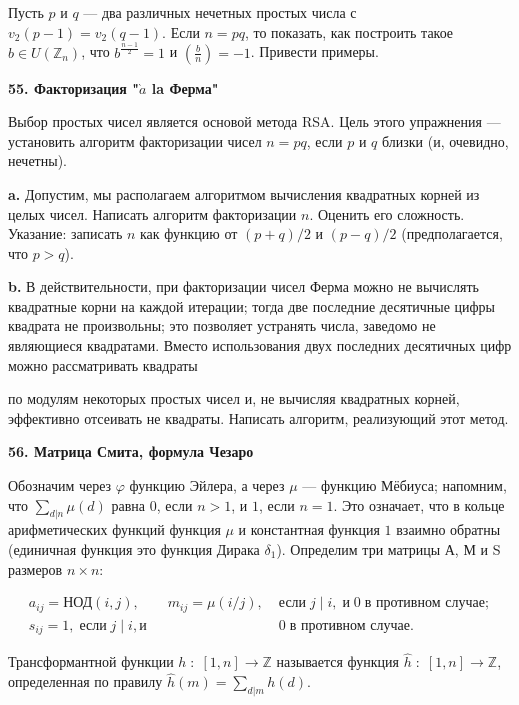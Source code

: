 \documentclass{mai_book}
\begin{document}
\medskip
Пусть $p$ и $q$ --- два различных нечетных простых числа с $v_2(p-1)=v_2(q-1)$. 
Если $n=pq$, то показать, как построить такое $b\in U(\mathbb {Z}_n)$, что $b^{\frac{n-1}2}=1$ и $(\frac{b}n)=-1$. Привести примеры.

\bigskip
\noindent\textbf{55. Факторизация "$\grave{a}$ la Ферма"}

\medskip
Выбор простых чисел является основой метода RSA. 
Цель этого упражнения --- установить алгоритм факторизации чисел $n=pq$, если $p$ и $q$ близки (и, очевидно, нечетны).

\smallskip
\textbf{a.} Допустим, мы располагаем алгоритмом вычисления квадрат­ных корней из целых чисел. 
Написать алгоритм факторизации $n$.
Оце­нить его сложность. 
Указание: записать $n$ как функцию от $(p+q)/2$ и $(p-q)/2$ (предполагается, что $p > q$).

\textbf{b.} В действительности, при факторизации чисел Ферма можно не вычислять квадратные корни на каждой итерации; тогда две послед­ние десятичные цифры квадрата не произвольны; это позволяет устра­нять числа, заведомо не являющиеся квадратами. 
Вместо использова­ния двух последних десятичных цифр можно рассматривать квадраты

\newpage


\noindent по модулям некоторых простых чисел и, не вычисляя квадратных кор­ней, эффективно отсеивать не квадраты. 
Написать алгоритм, реализу­ющий этот метод.

\bigskip
\noindent\textbf{56. Матрица Смита, формула Чезаро}

\medskip
Обозначим через $\varphi$ функцию Эйлера, а через $\mu$ --- функцию Мёбиуса; напомним, что $\sum_{d|n}\mu(d)$ равна $0$, если $n > 1$, и $1$, если $n=1$. 
Это означает, что в кольце арифметических функций функция $\mu$ и константная
функция $1$ взаимно обратны (единичная функция это функция Дирака $\delta_1$). 
Определим три матрицы А, М и S размеров $n\times n$:


$$
\begin{aligned}
a_{ij}=\text{НОД}(i,j),\qquad m_{ij}=\mu(i/j),\; &\text{если}\; j\;|\;i,\; \text{и}\; 0\; \text{в противном случае};\\
s_{ij}=1,\; \text{если}\; j\;|\;i, \text{и}\; &0\; \text{в противном случае}.
\end{aligned}
$$


\medskip
\noindent Трансформантной функции $h\; :\; [1,n] \rightarrow \mathbb{Z}$ называется функция $\hat{h}\; :\; [1,n] \rightarrow \mathbb{Z}$, определенная по правилу $\hat{h}(m)=\sum_{d|m}h(d)$.
\end{document}
